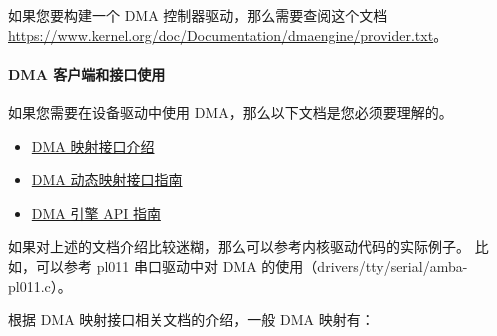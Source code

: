 如果您要构建一个 DMA 控制器驱动，那么需要查阅这个文档
\url{https://www.kernel.org/doc/Documentation/dmaengine/provider.txt}。

\paragraph{DMA 客户端和接口使用}

如果您需要在设备驱动中使用 DMA，那么以下文档是您必须要理解的。

\begin{itemize}
  \item \href{https://www.kernel.org/doc/Documentation/DMA-API.txt}{DMA 映射接口介绍}
  \item \href{https://www.kernel.org/doc/Documentation/DMA-API-HOWTO.txt}{DMA 动态映射接口指南}
  \item \href{https://www.kernel.org/doc/Documentation/dmaengine/client.txt}{DMA 引擎 API 指南}
\end{itemize}

如果对上述的文档介绍比较迷糊，那么可以参考内核驱动代码的实际例子。
比如，可以参考 pl011 串口驱动中对 DMA 的使用（drivers/tty/serial/amba-pl011.c）。

根据 DMA 映射接口相关文档的介绍，一般 DMA 映射有：

